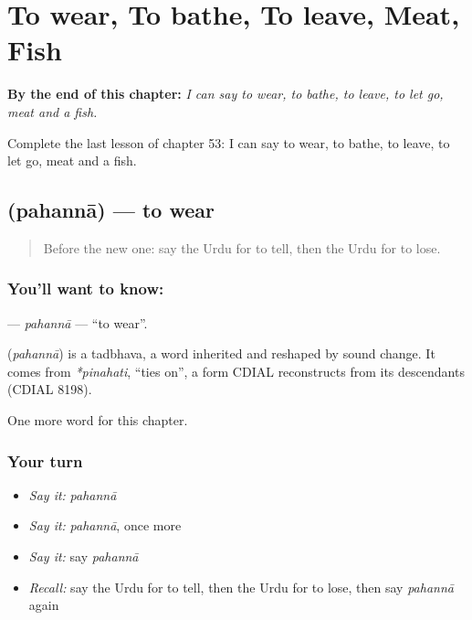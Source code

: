 
\chapter{To wear, To bathe, To leave, Meat, Fish}
\label{ch:ur-to-wear-to-bathe-to-leave-meat-fish}

\begin{chapteropening}
\textbf{By the end of this chapter:} \emph{I can say to wear, to bathe, to leave, to let go, meat and a fish.}

Complete the last lesson of chapter 53: I can say to wear, to bathe, to leave, to let go, meat and a fish.
\end{chapteropening}

\section[\texorpdfstring{\ur{پہننا} (pahannā)}{پہننا (pahannā)}]{ (pahannā) — to wear}

\label{lesson:UR-C53-pahanna}



\begin{quote}
Before the new one: say the Urdu for to tell, then the Urdu for to lose.
\end{quote}

\subsection*{You'll want to know: }
\textbf{} — \emph{pahannā} — \textquotedblleft{}to wear\textquotedblright{}.

\begin{cousinweb}
\textbf{} (\emph{pahannā}) is a tadbhava, a word inherited and reshaped by sound change. It comes from \emph{*pinahati}, \textquotedblleft{}ties on\textquotedblright{}, a form CDIAL reconstructs from its descendants (CDIAL 8198).
\end{cousinweb}

\begin{grammarlens}[title={What you've built}]
One more word for this chapter.
\end{grammarlens}

\subsection*{Your turn}
\begin{itemize}
\raggedright
  \item \emph{Say it:} \emph{pahannā}
  \item \emph{Say it:} \emph{pahannā}, once more
  \item \emph{Say it:} say \emph{pahannā}
  \item \emph{Recall:} say the Urdu for to tell, then the Urdu for to lose, then say \emph{pahannā} again
\end{itemize}


